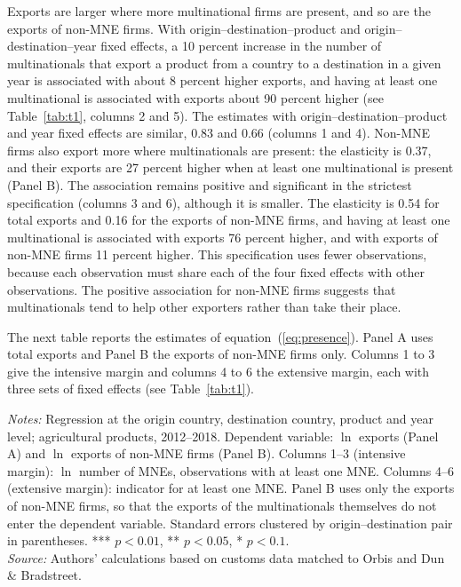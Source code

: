 \documentclass[11pt,a4paper]{article}
\newcommand{\srcnote}{\textit{Source:} Authors' calculations based on customs data matched to Orbis and Dun \& Bradstreet.}
\begin{document}
Exports are larger where more multinational firms are present, and so are the exports of non-MNE
firms. With origin--destination--product and origin--destination--year fixed effects, a 10 percent
increase in the number of multinationals that export a product from a country to a destination in a
given year is associated with about 8 percent higher exports, and having at least one multinational
is associated with exports about 90 percent higher (see Table~\ref{tab:t1}, columns 2 and 5). The
estimates with origin--destination--product and year fixed effects are similar, 0.83 and 0.66
(columns 1 and 4). Non-MNE firms also export more where
multinationals are present: the elasticity is 0.37, and their exports are 27 percent higher when at
least one multinational is present (Panel B). The association remains positive and
significant in the strictest specification (columns 3 and 6), although it is smaller. The
elasticity is 0.54 for total exports and 0.16 for the exports of non-MNE firms, and having at least
one multinational is associated with exports 76 percent higher, and with exports of non-MNE firms 11
percent higher. This specification uses fewer observations, because each observation must share each
of the four fixed effects with other observations. The positive association for non-MNE firms suggests that multinationals tend to
help other exporters rather than take their place.

The next table reports the estimates of equation~(\ref{eq:presence}). Panel A uses total exports
and Panel B the exports of non-MNE firms only. Columns 1 to 3 give the intensive margin and
columns 4 to 6 the extensive margin, each with three sets of fixed effects (see Table~\ref{tab:t1}).
\begin{table}[H]\centering\small%
  \caption{Multinational Presence and Agricultural Exports}%
  \label{tab:t1}%
  \par\vspace{3pt}%
  \begin{minipage}{0.95\textwidth}\footnotesize %
  \textit{Notes:} Regression at the origin country, destination country, product and year level; agricultural products, 2012--2018. Dependent variable: $\ln$ exports (Panel A) and $\ln$ exports of non-MNE firms (Panel B). Columns 1--3 (intensive margin): $\ln$ number of MNEs, observations with at least one MNE. Columns 4--6 (extensive margin): indicator for at least one MNE. Panel B uses only the exports of non-MNE firms, so that the exports of the multinationals themselves do not enter the dependent variable. Standard errors clustered by origin--destination pair in parentheses. *** $p<0.01$, ** $p<0.05$, * $p<0.1$.\\[3pt]%
  \srcnote%
  \end{minipage}%
  \end{table}
\end{document}
